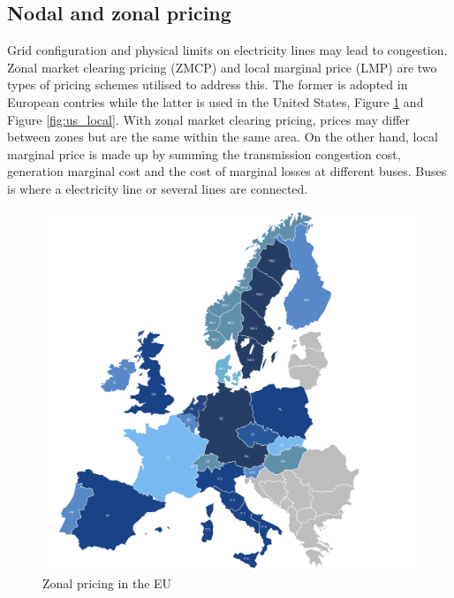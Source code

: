\subsection{Nodal and zonal pricing}
Grid configuration and physical limits on electricity lines may lead to congestion. Zonal market clearing pricing (ZMCP) and local marginal price (LMP) are two types of pricing schemes utilised to address this. The former is adopted in European contries while the latter is used in the United States, Figure \ref{fig:eu_zonal} and Figure \ref{fig:us_local}.
With zonal market clearing pricing, prices may differ between zones but are the same within the same area.
On the other hand, local marginal price is made up by summing the transmission congestion cost, generation marginal cost and the cost of marginal losses at different buses. Buses is where a electricity line or several lines are connected.
\begin{figure}[!h]
    \includegraphics[width=\textwidth]{images/eu_zonal.png}
    \caption[Zonal pricing in the EU]{Zonal pricing in the EU }
    \label{fig:eu_zonal}
\end{figure}

